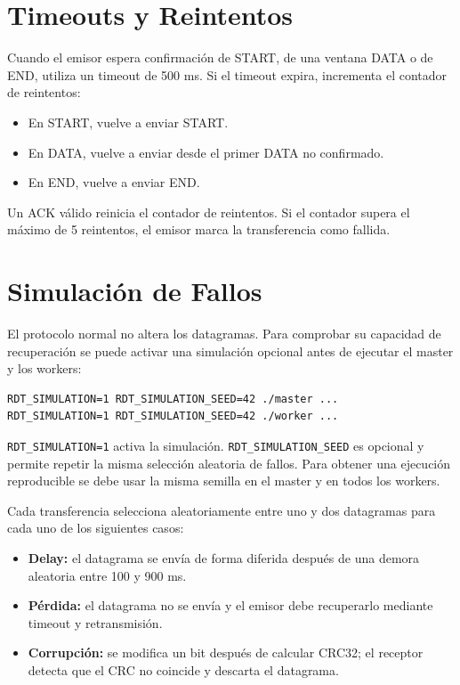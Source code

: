 \documentclass[12pt]{article}
\begin{document}
\section{Timeouts y Reintentos}

Cuando el emisor espera confirmación de START, de una ventana DATA o de END,
utiliza un timeout de 500 ms. Si el timeout expira, incrementa el contador de
reintentos:

\begin{itemize}
\item En START, vuelve a enviar START.
\item En DATA, vuelve a enviar desde el primer DATA no confirmado.
\item En END, vuelve a enviar END.
\end{itemize}

Un ACK válido reinicia el contador de reintentos. Si el contador supera el
máximo de 5 reintentos, el emisor marca la transferencia como fallida.

\section{Simulación de Fallos}

El protocolo normal no altera los datagramas. Para comprobar su capacidad de
recuperación se puede activar una simulación opcional antes de ejecutar el
master y los workers:

\begin{verbatim}
RDT_SIMULATION=1 RDT_SIMULATION_SEED=42 ./master ...
RDT_SIMULATION=1 RDT_SIMULATION_SEED=42 ./worker ...
\end{verbatim}

\texttt{RDT\_SIMULATION=1} activa la simulación.
\texttt{RDT\_SIMULATION\_SEED} es opcional y permite repetir la misma selección
aleatoria de fallos. Para obtener una ejecución reproducible se debe usar la
misma semilla en el master y en todos los workers.

Cada transferencia selecciona aleatoriamente entre uno y dos datagramas para
cada uno de los siguientes casos:

\begin{itemize}
\item \textbf{Delay:} el datagrama se envía de forma diferida después de una demora aleatoria entre 100 y 900 ms.
\item \textbf{Pérdida:} el datagrama no se envía y el emisor debe recuperarlo mediante timeout y retransmisión.
\item \textbf{Corrupción:} se modifica un bit después de calcular CRC32; el receptor detecta que el CRC no coincide y descarta el datagrama.
\end{itemize}
\end{document}
